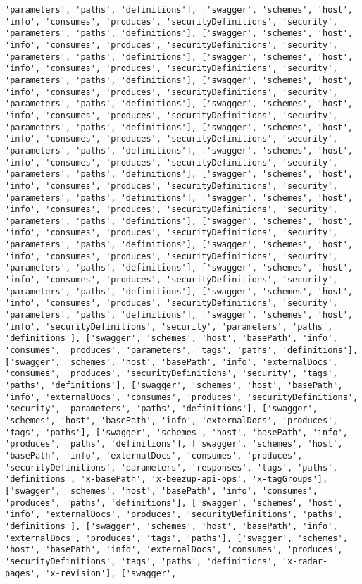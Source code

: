 \documentclass[11pt]{article}
\begin{document}
\begin{Verbatim}[commandchars=\\\{\}]
'parameters', 'paths', 'definitions'], ['swagger', 'schemes', 'host', 'info', 'consumes', 'produces', 'securityDefinitions', 'security', 'parameters', 'paths', 'definitions'], ['swagger', 'schemes', 'host', 'info', 'consumes', 'produces', 'securityDefinitions', 'security', 'parameters', 'paths', 'definitions'], ['swagger', 'schemes', 'host', 'info', 'consumes', 'produces', 'securityDefinitions', 'security', 'parameters', 'paths', 'definitions'], ['swagger', 'schemes', 'host', 'info', 'consumes', 'produces', 'securityDefinitions', 'security', 'parameters', 'paths', 'definitions'], ['swagger', 'schemes', 'host', 'info', 'consumes', 'produces', 'securityDefinitions', 'security', 'parameters', 'paths', 'definitions'], ['swagger', 'schemes', 'host', 'info', 'consumes', 'produces', 'securityDefinitions', 'security', 'parameters', 'paths', 'definitions'], ['swagger', 'schemes', 'host', 'info', 'consumes', 'produces', 'securityDefinitions', 'security', 'parameters', 'paths', 'definitions'], ['swagger', 'schemes', 'host', 'info', 'consumes', 'produces', 'securityDefinitions', 'security', 'parameters', 'paths', 'definitions'], ['swagger', 'schemes', 'host', 'info', 'consumes', 'produces', 'securityDefinitions', 'security', 'parameters', 'paths', 'definitions'], ['swagger', 'schemes', 'host', 'info', 'consumes', 'produces', 'securityDefinitions', 'security', 'parameters', 'paths', 'definitions'], ['swagger', 'schemes', 'host', 'info', 'consumes', 'produces', 'securityDefinitions', 'security', 'parameters', 'paths', 'definitions'], ['swagger', 'schemes', 'host', 'info', 'consumes', 'produces', 'securityDefinitions', 'security', 'parameters', 'paths', 'definitions'], ['swagger', 'schemes', 'host', 'info', 'consumes', 'produces', 'securityDefinitions', 'security', 'parameters', 'paths', 'definitions'], ['swagger', 'schemes', 'host', 'info', 'securityDefinitions', 'security', 'parameters', 'paths', 'definitions'], ['swagger', 'schemes', 'host', 'basePath', 'info', 'consumes', 'produces', 'parameters', 'tags', 'paths', 'definitions'], ['swagger', 'schemes', 'host', 'basePath', 'info', 'externalDocs', 'consumes', 'produces', 'securityDefinitions', 'security', 'tags', 'paths', 'definitions'], ['swagger', 'schemes', 'host', 'basePath', 'info', 'externalDocs', 'consumes', 'produces', 'securityDefinitions', 'security', 'parameters', 'paths', 'definitions'], ['swagger', 'schemes', 'host', 'basePath', 'info', 'externalDocs', 'produces', 'tags', 'paths'], ['swagger', 'schemes', 'host', 'basePath', 'info', 'produces', 'paths', 'definitions'], ['swagger', 'schemes', 'host', 'basePath', 'info', 'externalDocs', 'consumes', 'produces', 'securityDefinitions', 'parameters', 'responses', 'tags', 'paths', 'definitions', 'x-basePath', 'x-beezup-api-ops', 'x-tagGroups'], ['swagger', 'schemes', 'host', 'basePath', 'info', 'consumes', 'produces', 'paths', 'definitions'], ['swagger', 'schemes', 'host', 'info', 'externalDocs', 'produces', 'securityDefinitions', 'paths', 'definitions'], ['swagger', 'schemes', 'host', 'basePath', 'info', 'externalDocs', 'produces', 'tags', 'paths'], ['swagger', 'schemes', 'host', 'basePath', 'info', 'externalDocs', 'consumes', 'produces', 'securityDefinitions', 'tags', 'paths', 'definitions', 'x-radar-pages', 'x-revision'], ['swagger', 
\end{Verbatim}
\end{document}
